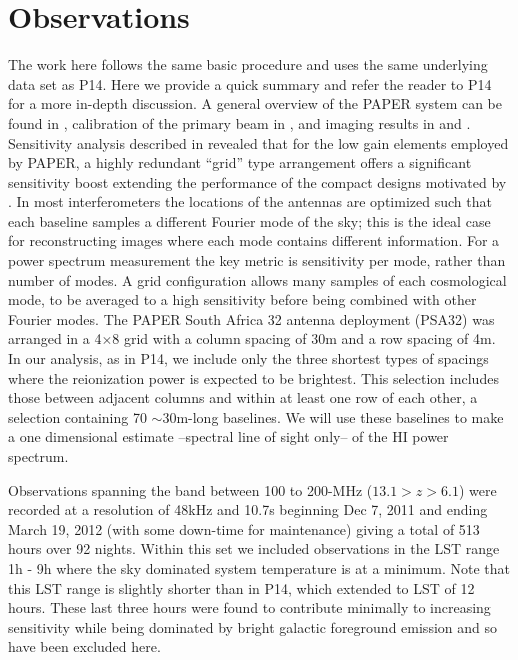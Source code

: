 \documentclass[preprint2]{aastex}
\begin{document}
\section{Observations}
\label{sec:observations}
The work here follows the same basic procedure and uses the same underlying data set as P14. Here we provide a quick summary and refer the reader to P14 for a more in-depth discussion.  A general overview of the PAPER system can be found in \cite{Parsons:2010p6757}, calibration of the primary beam in \cite{Pober:2012p8800}, and imaging results in \cite{Jacobs:2011p8438,jacobs:2013b} and \citet{Stefan:2013p9926}.  Sensitivity analysis described in \cite{Parsons:2012p9028} revealed that for the low gain elements employed by PAPER, a highly redundant ``grid'' type arrangement offers a significant sensitivity boost extending the performance of the compact designs motivated by \citet{Morales:2004p2494,Bowman:2006p1887,Lidz:2008p8251}.  In most interferometers the locations of the antennas are optimized such that each baseline samples a different Fourier mode of the sky; this is the ideal case for reconstructing images where each mode contains different information.  For a power spectrum measurement the key metric is sensitivity per mode, rather than number of modes.  A grid configuration allows many samples of each cosmological mode, to be averaged to a high sensitivity before being combined with other Fourier modes.  The PAPER South Africa 32 antenna deployment (PSA32) was arranged in a 4$\times$8 grid with a column spacing of 30m and a row spacing of 4m.  In our analysis, as in P14, we include only the three shortest types of spacings where the reionization power is expected to be brightest. This selection includes those between adjacent columns and within at least one row of each other, a selection containing 70 $\sim$30m-long baselines.  We will use these baselines to make a one dimensional estimate --spectral line of sight only-- of the HI power spectrum.

Observations spanning the band between 100 to 200-MHz ($13.1>z>6.1$) were recorded at a resolution of 48kHz and 10.7s  beginning Dec 7, 2011 and ending March 19, 2012 (with some down-time for maintenance) giving a total of 513 hours over 92 nights.  Within this set we included observations in the LST range 1h - 9h where the sky dominated system temperature is at a minimum.  Note that this LST range is slightly shorter than in P14, which extended to LST of 12 hours. These last three hours were found to contribute minimally to increasing sensitivity while being dominated by bright galactic foreground emission and so have been excluded here.
\end{document}
